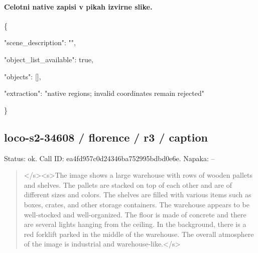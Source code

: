 \documentclass[10pt,a4paper]{article}
\begin{document}
\paragraph{Celotni native zapisi v pikah izvirne slike.}
\{\par
  "scene\_description":\allowbreak{} "",\allowbreak{}\par
  "object\_list\_available":\allowbreak{} true,\allowbreak{}\par
  "objects":\allowbreak{} [],\allowbreak{}\par
  "extraction":\allowbreak{} "native regions; invalid coordinates remain rejected"\par
\}
\subsection*{loco-s2-34608 / florence / r3 / caption}
Status: ok. Call ID: ea4fd957c0d24346ba752995bdbd0e6e. Napaka: --
\begin{quote}\footnotesize
</s>\allowbreak{}<s>\allowbreak{}The image shows a large warehouse with rows of wooden pallets and shelves. The pallets are stacked on top of each other and are of different sizes and colors. The shelves are filled with various items such as boxes,\allowbreak{} crates,\allowbreak{} and other storage containers. The warehouse appears to be well-stocked and well-organized. The floor is made of concrete and there are several lights hanging from the ceiling. In the background,\allowbreak{} there is a red forklift parked in the middle of the warehouse. The overall atmosphere of the image is industrial and warehouse-like.</s>\allowbreak{}
\end{quote}
\end{document}
